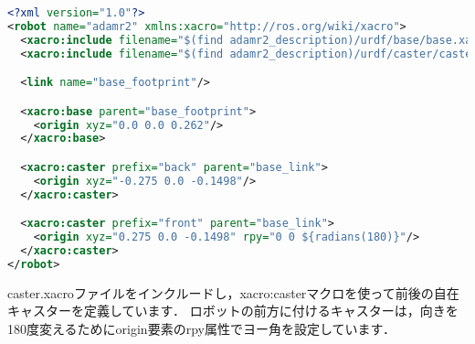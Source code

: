 \documentclass[{../../master}]{subfiles}
\begin{document}
\begin{lstlisting}[language=XML, label=code:robot_xacro_add_caster_link, caption=Add Caster-Link to Robot Model]
<?xml version="1.0"?>
<robot name="adamr2" xmlns:xacro="http://ros.org/wiki/xacro">
  <xacro:include filename="$(find adamr2_description)/urdf/base/base.xacro"/>
  <xacro:include filename="$(find adamr2_description)/urdf/caster/caster.xacro"/>

  <link name="base_footprint"/>

  <xacro:base parent="base_footprint">
    <origin xyz="0.0 0.0 0.262"/>
  </xacro:base>

  <xacro:caster prefix="back" parent="base_link">
    <origin xyz="-0.275 0.0 -0.1498"/>
  </xacro:caster>

  <xacro:caster prefix="front" parent="base_link">
    <origin xyz="0.275 0.0 -0.1498" rpy="0 0 ${radians(180)}"/>
  </xacro:caster>
</robot>
\end{lstlisting}

\textsf{caster.xacro}ファイルをインクルードし，\textsf{xacro:caster}マクロを使って前後の自在キャスターを定義しています．
ロボットの前方に付けるキャスターは，向きを180度変えるために\textsf{origin}要素の\textsf{rpy}属性でヨー角を設定しています．
\end{document}
